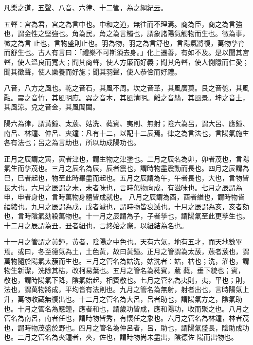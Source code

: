 \begin{pinyinscope}
 凡樂之道，五聲、八音、六律、十二管，為之綱紀云。



 五聲：宮為君，宮之為言中也。中和之道，無往而不理焉。商為臣，商之為言強也，謂金性之堅強也。角為民，角之為言觸也，謂象諸陽氣觸物而生也。徵為事，徵之為言
 止也，言物盛則止也。羽為物，羽之為言舒也，言陽氣將復，萬物孳育而舒生也。古人有言曰：「禮樂不可斯須去身。」化上遷善，有如不及。是以聞其宮聲，使人溫良而寬大；聞其商聲，使人方廉而好義；聞其角聲，使人惻隱而仁愛；聞其徵聲，使人樂養而好施；聞其羽聲，使人恭儉而好禮。



 八音，八方之風也。乾之音石，其風不周。坎之音革，其風廣莫。艮之音匏，其風融。震之音竹，其風明庶。巽之音木，其風清明。離之音絲，其風景。坤之音土，其風涼。兌之音金，其風閶闔。



 陽六為律，謂黃鐘、太蔟、姑洗、蕤賓、夷則、無射；陰六為呂，謂大呂、應鐘、南呂、林鐘、仲呂、夾鐘：凡有十二，以配十二辰焉。律之為言法也，言陽氣施生各有法也；呂之為言助也，所以助成陽功也。



 正月之辰謂之寅，寅者津也，謂生物之津塗也。二月之辰名為卯，卯者茂也，言陽氣生而孳茂也。三月之辰名為辰，辰者震也，謂時物盡震動而長也。四月之辰謂為巳，巳者起也，物至此時畢盡而起也。五月之辰謂為午，午者長也，大也，言物皆長大也。六月之辰謂之未，未者味也，言時萬物向成，有滋味也。七月之辰謂為申，申者身也，言時萬物身體皆成就也。
 八月之辰謂為酉，酉者緧也，謂時物皆綇縮也。九月之辰謂為戌，戌者滅也，謂時物皆衰滅也。十月之辰謂為亥，亥者劾也，言時陰氣劾殺萬物也。十一月之辰謂為子，子者孳也，謂陽氣至此更孳生也。十二月之辰謂為丑，丑者紐也，言終始之際，以紐結為名也。



 十一月之管謂之黃鐘，黃者，陰陽之中色也。天有六氣，地有五才，而天地數畢焉。或曰，冬至德氣為土，土色黃，故曰黃鐘。正月之管謂為太蔟，蔟者蔟也，謂萬物隨於陽氣太蔟而生也。三月之管名為姑洗，姑洗者：姑，枯也；洗，濯也，謂物生新潔，洗除其枯，改柯易葉也。五月之管名為蕤賓，葳
 蕤，垂下貌也；賓，敬也，謂時陽氣下降，陰氣始起，相賓敬也。七月之管名為夷則，夷，平也；則，法也，謂萬物將成，平均皆有法則也。九月之管名為無射，射者出也，言時陽氣上升，萬物收藏無復出也。十二月之管名為大呂，呂者助也，謂陽氣方之，陰氣助也。十月之管名為應鐘，應者和也，謂歲功皆成，應和陽功，收而聚之也。八月之管名為南呂，南者任也，謂時物皆秀，有懷任之象也。六月之管名為林鐘，林者茂也，謂時物茂盛於野也。四月之管名為仲呂者，呂，助也，謂陽氣盛長，陰助成功也。二月之管名為夾鐘者，夾，佐也，謂時物尚未盡出，陰德佐
 陽而出物也。




\end{pinyinscope}
